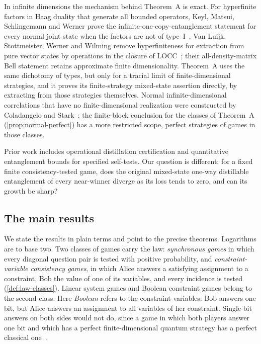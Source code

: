 In infinite dimensions the mechanism behind Theorem~A is exact. For hyperfinite factors in Haag duality that generate all
bounded operators, Keyl, Matsui, Schlingemann and Werner prove the infinite-one-copy-entanglement statement for every normal
joint state when the factors are not of type~I~\cite[Theorem~4.9]{KMSW06}. Van Luijk, Stottmeister, Werner and Wilming remove
hyperfiniteness for extraction from pure vector states by operations in the closure of LOCC~\cite[Theorem~54]{vLSWW25}; their
all-density-matrix Bell statement retains approximate finite dimensionality. Theorem~A uses the same dichotomy of types, but only
for a tracial limit of finite-dimensional strategies, and it proves its finite-strategy mixed-state assertion directly, by
extracting from those strategies themselves. Normal infinite-dimensional correlations that have no finite-dimensional
realization were constructed by Coladangelo and Stark~\cite{CoSt20}; the finite-block conclusion for the classes of Theorem~A
(\cref{prop:normal-perfect}) has a more restricted scope, perfect strategies of games in those classes.

Prior work includes operational distillation certification and quantitative entanglement bounds for specified self-tests. Our
question is different: for a fixed finite consistency-tested game, does the original mixed-state one-way distillable entanglement
of every near-winner diverge as its loss tends to zero, and can its growth be sharp?

\subsection{The main results}\label{sec:intro-results}

We state the results in plain terms and point to the precise theorems. Logarithms are to base two. Two classes of games carry the
law: \emph{synchronous games} in which every diagonal question pair is tested with positive probability, and
\emph{constraint-variable consistency games}, in which Alice answers a satisfying assignment to a constraint, Bob the value of one
of its variables, and every incidence is tested (\cref{def:law-classes}). Linear system games and Boolean constraint games belong to
the second class. Here \emph{Boolean} refers to the constraint variables: Bob answers one bit, but Alice answers an assignment to all
variables of her constraint. Single-bit answers on both sides would not do, since a game in which both players answer one bit and
which has a perfect finite-dimensional quantum strategy has a perfect classical one~\cite[Theorem~3]{CHTW04}.

